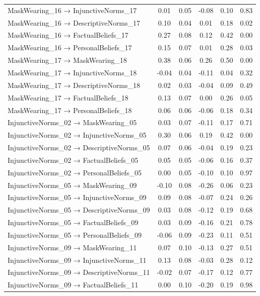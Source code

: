 \documentclass[
  man, donotrepeattitle,floatsintext]{apa6}
\begin{document}
\begin{center}
\begin{ThreePartTable}
{\begin{longtable}{lccccc}
MaskWearing\_16 → InjunctiveNorms\_17 & 0.01 & 0.05 & -0.08 & 0.10 & 0.83\\
MaskWearing\_16 → DescriptiveNorms\_17 & 0.10 & 0.04 & 0.01 & 0.18 & 0.02\\
MaskWearing\_16 → FactualBeliefs\_17 & 0.27 & 0.08 & 0.12 & 0.42 & 0.00\\
MaskWearing\_16 → PersonalBeliefs\_17 & 0.15 & 0.07 & 0.01 & 0.28 & 0.03\\
MaskWearing\_17 → MaskWearing\_18 & 0.38 & 0.06 & 0.26 & 0.50 & 0.00\\
MaskWearing\_17 → InjunctiveNorms\_18 & -0.04 & 0.04 & -0.11 & 0.04 & 0.32\\
MaskWearing\_17 → DescriptiveNorms\_18 & 0.02 & 0.03 & -0.04 & 0.09 & 0.49\\
MaskWearing\_17 → FactualBeliefs\_18 & 0.13 & 0.07 & 0.00 & 0.26 & 0.05\\
MaskWearing\_17 → PersonalBeliefs\_18 & 0.06 & 0.06 & -0.06 & 0.18 & 0.34\\
InjunctiveNorms\_02 → MaskWearing\_05 & 0.03 & 0.07 & -0.11 & 0.17 & 0.71\\
InjunctiveNorms\_02 → InjunctiveNorms\_05 & 0.30 & 0.06 & 0.19 & 0.42 & 0.00\\
InjunctiveNorms\_02 → DescriptiveNorms\_05 & 0.07 & 0.06 & -0.04 & 0.19 & 0.23\\
InjunctiveNorms\_02 → FactualBeliefs\_05 & 0.05 & 0.05 & -0.06 & 0.16 & 0.37\\
InjunctiveNorms\_02 → PersonalBeliefs\_05 & 0.00 & 0.05 & -0.10 & 0.10 & 0.97\\
InjunctiveNorms\_05 → MaskWearing\_09 & -0.10 & 0.08 & -0.26 & 0.06 & 0.23\\
InjunctiveNorms\_05 → InjunctiveNorms\_09 & 0.09 & 0.08 & -0.07 & 0.24 & 0.26\\
InjunctiveNorms\_05 → DescriptiveNorms\_09 & 0.03 & 0.08 & -0.12 & 0.19 & 0.68\\
InjunctiveNorms\_05 → FactualBeliefs\_09 & 0.03 & 0.09 & -0.16 & 0.21 & 0.78\\
InjunctiveNorms\_05 → PersonalBeliefs\_09 & -0.06 & 0.09 & -0.23 & 0.11 & 0.51\\
InjunctiveNorms\_09 → MaskWearing\_11 & 0.07 & 0.10 & -0.13 & 0.27 & 0.51\\
InjunctiveNorms\_09 → InjunctiveNorms\_11 & 0.13 & 0.08 & -0.03 & 0.28 & 0.12\\
InjunctiveNorms\_09 → DescriptiveNorms\_11 & -0.02 & 0.07 & -0.17 & 0.12 & 0.77\\
InjunctiveNorms\_09 → FactualBeliefs\_11 & 0.00 & 0.10 & -0.20 & 0.19 & 0.98\\

\end{longtable}}
\end{ThreePartTable}
\end{center}
\end{document}

